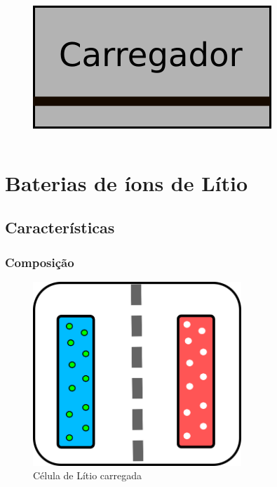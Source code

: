 \documentclass{beamer}
\begin{document}
\begin{frame}
\begin{columns}
	\begin{figure}[h]
		\includegraphics[width=\textwidth]{charger2}
	\end{figure}
\end{columns}	

	\end{frame}							
	


\section{Baterias de íons de Lítio}
	\subsection{Características}
		\begin{frame}\frametitle{Composição}
	
\begin{figure}[h]
	\centering
	\includegraphics[width=0.70\textwidth]{battery-charged}
	\caption{Célula de Lítio carregada}
	\label{fig:battery-charged}
\end{figure}
\end{frame}							
\end{document}

